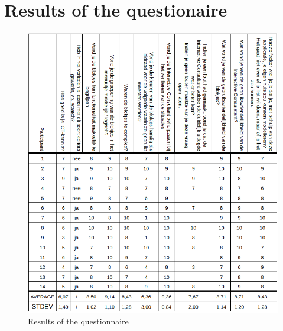 \documentclass[11pt,a4paper]{report}
\begin{document}
\section{Results of the questionaire}
\label{appendix:questionnaire}
\begin{figure}[h!]
    \centering
    \includegraphics[width=1\linewidth]{images/results_questions.png}
    \caption{Results of the questionnaire}
\end{figure}
\end{document}
